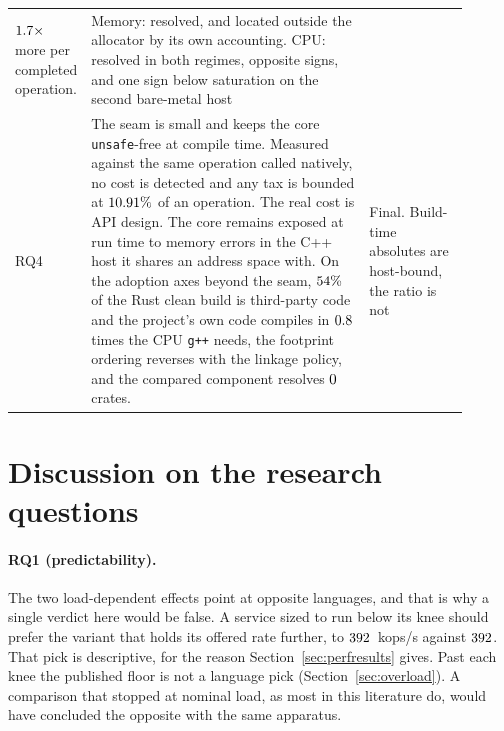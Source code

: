 \documentclass[english,oneside,a4paper,censored,csm,software-track-2020]{HYthesisML}
\begin{document}
\begin{table}[tp]
\begin{tabular}{@{}p{0.06\linewidth} p{0.62\linewidth} p{0.22\linewidth}@{}}
$1.7\times$ more per completed operation. & Memory: resolved, and located outside the allocator by its own
accounting. CPU: resolved in both regimes, opposite signs, and one sign below saturation on the
second bare-metal host \\
RQ4 & The seam is small and keeps the core \texttt{unsafe}-free at compile time. Measured against
the same operation called natively, no cost is detected and any tax is bounded at
$10.91\%$ of an operation. The real cost is API design. The core remains exposed at run
time to memory errors in the C++ host it shares an address space with. On the adoption axes beyond
the seam, $54\%$ of the Rust clean build is third-party code and the project's own
code compiles in $0.8$ times the CPU \texttt{g++} needs, the footprint
ordering reverses with the linkage policy, and the compared component resolves $0$ crates.
& Final. Build-time absolutes are host-bound, the ratio is not \\
\hline
\end{tabular}
\end{table}

\section{Discussion on the research questions}\label{sec:rqdiscussion}
\paragraph{RQ1 (predictability).} The two load-dependent effects point at opposite languages,
and that is why a single verdict here would be false. A service sized to run below its knee
should prefer the variant that holds its offered rate further, to $392$~kops/s
against $392$. That pick is descriptive, for the reason
Section~\ref{sec:perfresults} gives. Past each knee the published floor is not a language pick
(Section~\ref{sec:overload}). A comparison that stopped at nominal load, as most in
this literature do, would have concluded the opposite with the same apparatus.
\end{document}

